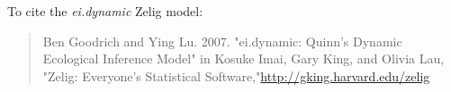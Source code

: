 To cite the \emph{ ei.dynamic } Zelig model:
 \begin{verse}
 Ben Goodrich and Ying Lu. 2007. "ei.dynamic: Quinn's Dynamic Ecological Inference Model" in Kosuke Imai, Gary King, and Olivia Lau, "Zelig: Everyone's Statistical Software,"\url{http://gking.harvard.edu/zelig} 
\end{verse}